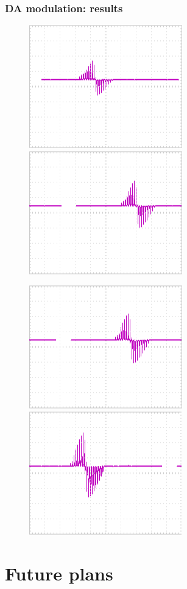 \documentclass[12pt, aspectratio=169]{beamer}
\begin{document}
\begin{frame}
  \frametitle{DA modulation: results}
  
\begin{figure}
\includegraphics[width=0.33\linewidth]{hebb_r_0_50K}
\includegraphics[width=0.33\linewidth]{hebb_r_25_25K}
\end{figure}
\begin{figure}
\includegraphics[width=0.33\linewidth]{hebb_r_37_5_12_5K}
\includegraphics[width=0.33\linewidth]{hebb_r_50_0K}
\end{figure}

\end{frame}

\section{Future plans}
\end{document}
